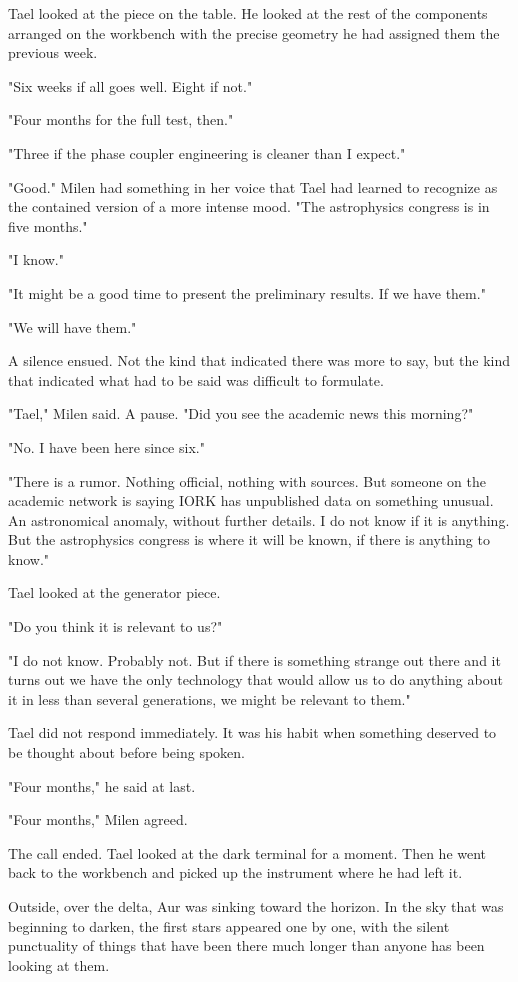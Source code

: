 \documentclass[11pt,a5paper,twoside]{book}
\begin{document}
Tael looked at the piece on the table. He looked at the rest of the components arranged on the workbench with the precise geometry he had assigned them the previous week.

"Six weeks if all goes well. Eight if not."

"Four months for the full test, then."

"Three if the phase coupler engineering is cleaner than I expect."

"Good." Milen had something in her voice that Tael had learned to recognize as the contained version of a more intense mood. "The astrophysics congress is in five months."

"I know."

"It might be a good time to present the preliminary results. If we have them."

"We will have them."

A silence ensued. Not the kind that indicated there was more to say, but the kind that indicated what had to be said was difficult to formulate.

"Tael," Milen said. A pause. "Did you see the academic news this morning?"

"No. I have been here since six."

"There is a rumor. Nothing official, nothing with sources. But someone on the academic network is saying IORK has unpublished data on something unusual. An astronomical anomaly, without further details. I do not know if it is anything. But the astrophysics congress is where it will be known, if there is anything to know."

Tael looked at the generator piece.

"Do you think it is relevant to us?"

"I do not know. Probably not. But if there is something strange out there and it turns out we have the only technology that would allow us to do anything about it in less than several generations, we might be relevant to them."

Tael did not respond immediately. It was his habit when something deserved to be thought about before being spoken.

"Four months," he said at last.

"Four months," Milen agreed.

The call ended. Tael looked at the dark terminal for a moment. Then he went back to the workbench and picked up the instrument where he had left it.

Outside, over the delta, Aur was sinking toward the horizon. In the sky that was beginning to darken, the first stars appeared one by one, with the silent punctuality of things that have been there much longer than anyone has been looking at them.
\end{document}
